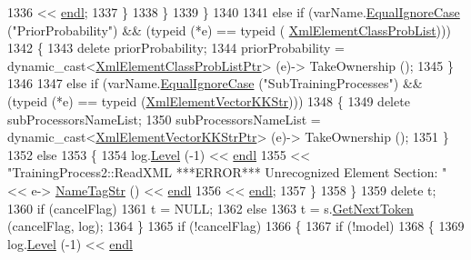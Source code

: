 \begin{DoxyCode}
1336               << \hyperlink{namespace_k_k_b_ad1f50f65af6adc8fa9e6f62d007818a8}{endl};
1337           \}
1338         \}
1339       \}
1340 
1341       \textcolor{keywordflow}{else} \textcolor{keywordflow}{if}  (varName.\hyperlink{class_k_k_b_1_1_k_k_str_a562f9696417c53f66bc4088eac072ab5}{EqualIgnoreCase} (\textcolor{stringliteral}{"PriorProbability"})  &&  (\textcolor{keyword}{typeid} (*e) == \textcolor{keyword}{typeid} (
      \hyperlink{namespace_k_k_m_l_l_a590810bfbb25bef1964a45832dacea2e}{XmlElementClassProbList})))
1342       \{
1343         \textcolor{keyword}{delete}  priorProbability;
1344         priorProbability = \textcolor{keyword}{dynamic\_cast<}\hyperlink{class_k_k_b_1_1_xml_element_template}{XmlElementClassProbListPtr}\textcolor{keyword}{>} (e)->
      TakeOwnership ();
1345       \}
1346 
1347       \textcolor{keywordflow}{else} \textcolor{keywordflow}{if}  (varName.\hyperlink{class_k_k_b_1_1_k_k_str_a562f9696417c53f66bc4088eac072ab5}{EqualIgnoreCase} (\textcolor{stringliteral}{"SubTrainingProcesses"})  &&  (\textcolor{keyword}{typeid} (*e) == \textcolor{keyword}{typeid}
       (\hyperlink{namespace_k_k_b_ae7f117b12a72568bc7ab4a0322f2c4a4}{XmlElementVectorKKStr})))
1348       \{
1349         \textcolor{keyword}{delete}  subProcessorsNameList;
1350         subProcessorsNameList = \textcolor{keyword}{dynamic\_cast<}\hyperlink{class_k_k_b_1_1_xml_element_template}{XmlElementVectorKKStrPtr}\textcolor{keyword}{>} (e)->
      TakeOwnership ();
1351       \}
1352       \textcolor{keywordflow}{else}
1353       \{
1354         log.\hyperlink{class_k_k_b_1_1_run_log_a32cf761d7f2e747465fd80533fdbb659}{Level} (-1) << \hyperlink{namespace_k_k_b_ad1f50f65af6adc8fa9e6f62d007818a8}{endl}
1355           << \textcolor{stringliteral}{"TrainingProcess2::ReadXML   ***ERROR***  Unrecognized Element Section: "} << e->
      \hyperlink{class_k_k_b_1_1_xml_element_a86a0fcbb58e998149503b7735690cd7b}{NameTagStr} () << \hyperlink{namespace_k_k_b_ad1f50f65af6adc8fa9e6f62d007818a8}{endl}
1356           << \hyperlink{namespace_k_k_b_ad1f50f65af6adc8fa9e6f62d007818a8}{endl};
1357       \}
1358     \}
1359     \textcolor{keyword}{delete}  t;
1360     \textcolor{keywordflow}{if}  (cancelFlag)
1361       t = NULL;
1362     \textcolor{keywordflow}{else}
1363       t = s.\hyperlink{class_k_k_b_1_1_xml_stream_a87cc738b05c666cf5d5c25beaab477b4}{GetNextToken} (cancelFlag, log);
1364   \}
1365   \textcolor{keywordflow}{if}  (!cancelFlag)
1366   \{
1367     \textcolor{keywordflow}{if}  (!model)
1368     \{
1369       log.\hyperlink{class_k_k_b_1_1_run_log_a32cf761d7f2e747465fd80533fdbb659}{Level} (-1) << \hyperlink{namespace_k_k_b_ad1f50f65af6adc8fa9e6f62d007818a8}{endl}

\end{DoxyCode}
